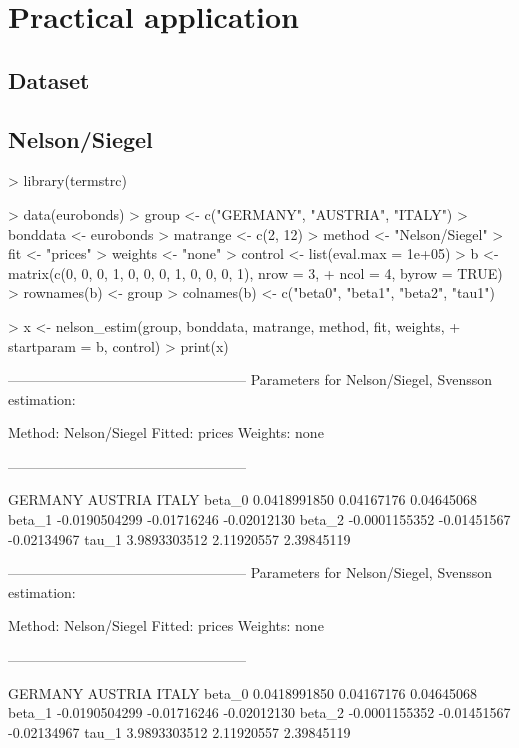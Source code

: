 \section{Practical application}
\label{sec:pract-appl}

\subsection{Dataset}




\subsection{Nelson/Siegel}

\begin{Schunk}
\begin{Sinput}
> library(termstrc)
\end{Sinput}
\end{Schunk}

\begin{Schunk}
\begin{Sinput}
> data(eurobonds)
> group <- c("GERMANY", "AUSTRIA", "ITALY")
> bonddata <- eurobonds
> matrange <- c(2, 12)
> method <- "Nelson/Siegel"
> fit <- "prices"
> weights <- "none"
> control <- list(eval.max = 1e+05)
> b <- matrix(c(0, 0, 0, 1, 0, 0, 0, 1, 0, 0, 0, 1), nrow = 3, 
+     ncol = 4, byrow = TRUE)
> rownames(b) <- group
> colnames(b) <- c("beta0", "beta1", "beta2", "tau1")
\end{Sinput}
\end{Schunk}

\begin{Schunk}
\begin{Sinput}
> x <- nelson_estim(group, bonddata, matrange, method, fit, weights, 
+     startparam = b, control)
> print(x)
\end{Sinput}
\begin{Soutput}
---------------------------------------------------
Parameters for Nelson/Siegel, Svensson estimation:

Method: Nelson/Siegel 
Fitted: prices 
Weights: none 

---------------------------------------------------

             GERMANY     AUSTRIA       ITALY
beta_0  0.0418991850  0.04167176  0.04645068
beta_1 -0.0190504299 -0.01716246 -0.02012130
beta_2 -0.0001155352 -0.01451567 -0.02134967
tau_1   3.9893303512  2.11920557  2.39845119

---------------------------------------------------
Parameters for Nelson/Siegel, Svensson estimation:

Method: Nelson/Siegel 
Fitted: prices 
Weights: none 

---------------------------------------------------

             GERMANY     AUSTRIA       ITALY
beta_0  0.0418991850  0.04167176  0.04645068
beta_1 -0.0190504299 -0.01716246 -0.02012130
beta_2 -0.0001155352 -0.01451567 -0.02134967
tau_1   3.9893303512  2.11920557  2.39845119
\end{Soutput}
\end{Schunk}


